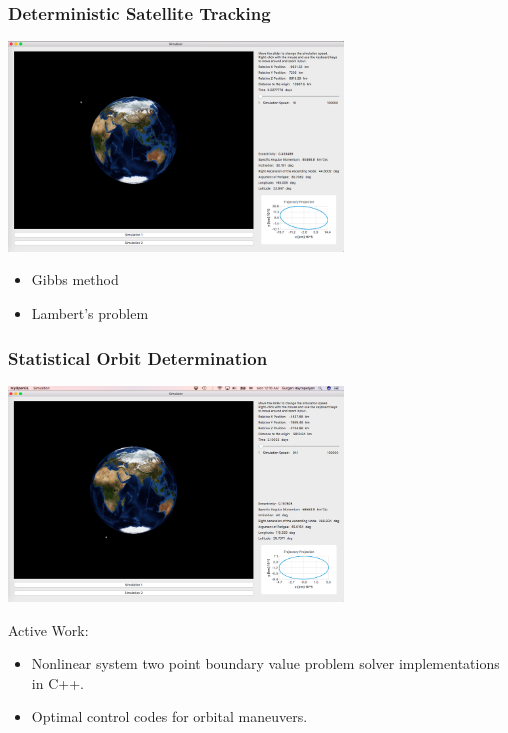 \documentclass[mathserif]{beamer}
\begin{document}
\begin{frame}
\frametitle{Deterministic Satellite Tracking}

\includegraphics[width=3.5in]{sat3.png}

\begin{itemize}
\item Gibbs method
\item Lambert's problem
\end{itemize}

\end{frame}

\begin{frame}
\frametitle{Statistical Orbit Determination}

\includegraphics[width=3.5in]{sat2.png}

Active Work:

\begin{itemize}
\item Nonlinear system two point boundary value problem solver implementations in C++.
\item Optimal control codes for orbital maneuvers.
\end{itemize}

\end{frame}
\end{document}

